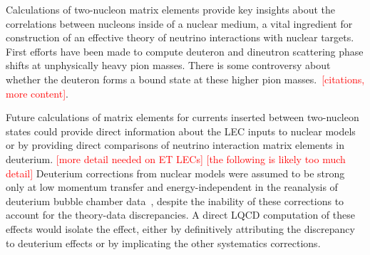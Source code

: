 Calculations of two-nucleon matrix elements provide key insights
 about the correlations between nucleons inside of a nuclear medium,
 a vital ingredient for construction of an effective theory
 of neutrino interactions with nuclear targets.
First efforts have been made to compute deuteron and dineutron scattering phase shifts
 at unphysically heavy pion masses.
There is some controversy about whether the deuteron forms a
 bound state at these higher pion masses.~\textcolor{red}{[citations, more content]}.

Future calculations of matrix elements for currents inserted between
 two-nucleon states could provide direct information about the LEC inputs to nuclear
 models~\cite{Drischler:2019xuo}
 or by providing direct comparisons of neutrino interaction matrix elements in deuterium.
\textcolor{red}{[more detail needed on ET LECs]}
\textcolor{red}{[the following is likely too much detail]}
Deuterium corrections from nuclear models were assumed to be strong only at low momentum transfer
 and energy-independent in the reanalysis of deuterium bubble chamber data~\cite{Meyer:2016oeg},
 despite the inability of these corrections to account for the theory-data discrepancies.
A direct LQCD computation of these effects would isolate the effect,
 either by definitively attributing the discrepancy to deuterium effects
 or by implicating the other systematics corrections.
